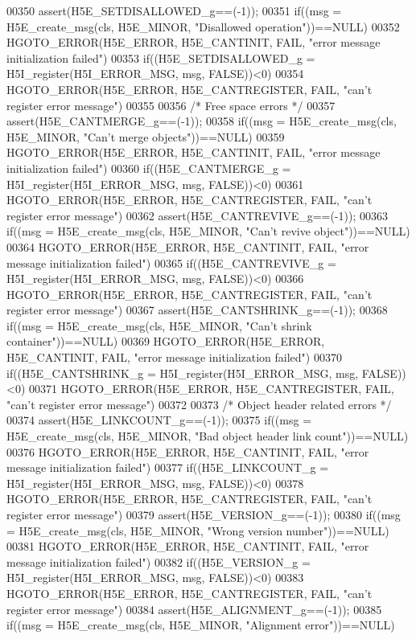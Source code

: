 \begin{DoxyCode}
00350 assert(H5E\_SETDISALLOWED\_g==(-1));
00351 if((msg = H5E\_create\_msg(cls, H5E\_MINOR, "Disallowed operation"))==NULL)
00352     HGOTO\_ERROR(H5E\_ERROR, H5E\_CANTINIT, FAIL, "error message initialization failed")
00353 if((H5E\_SETDISALLOWED\_g = H5I\_register(H5I\_ERROR\_MSG, msg, FALSE))<0)
00354     HGOTO\_ERROR(H5E\_ERROR, H5E\_CANTREGISTER, FAIL, "can't register error message")
00355 
00356 \textcolor{comment}{/* Free space errors */}
00357 assert(H5E\_CANTMERGE\_g==(-1));
00358 if((msg = H5E\_create\_msg(cls, H5E\_MINOR, "Can't merge objects"))==NULL)
00359     HGOTO\_ERROR(H5E\_ERROR, H5E\_CANTINIT, FAIL, "error message initialization failed")
00360 if((H5E\_CANTMERGE\_g = H5I\_register(H5I\_ERROR\_MSG, msg, FALSE))<0)
00361     HGOTO\_ERROR(H5E\_ERROR, H5E\_CANTREGISTER, FAIL, "can't register error message")
00362 assert(H5E\_CANTREVIVE\_g==(-1));
00363 if((msg = H5E\_create\_msg(cls, H5E\_MINOR, "Can't revive \textcolor{keywordtype}{object}"))==NULL)
00364     HGOTO\_ERROR(H5E\_ERROR, H5E\_CANTINIT, FAIL, "error message initialization failed")
00365 if((H5E\_CANTREVIVE\_g = H5I\_register(H5I\_ERROR\_MSG, msg, FALSE))<0)
00366     HGOTO\_ERROR(H5E\_ERROR, H5E\_CANTREGISTER, FAIL, "can't register error message")
00367 assert(H5E\_CANTSHRINK\_g==(-1));
00368 if((msg = H5E\_create\_msg(cls, H5E\_MINOR, "Can't shrink container"))==NULL)
00369     HGOTO\_ERROR(H5E\_ERROR, H5E\_CANTINIT, FAIL, "error message initialization failed")
00370 if((H5E\_CANTSHRINK\_g = H5I\_register(H5I\_ERROR\_MSG, msg, FALSE))<0)
00371     HGOTO\_ERROR(H5E\_ERROR, H5E\_CANTREGISTER, FAIL, "can't register error message")
00372 
00373 \textcolor{comment}{/* Object header related errors */}
00374 assert(H5E\_LINKCOUNT\_g==(-1));
00375 if((msg = H5E\_create\_msg(cls, H5E\_MINOR, "Bad \textcolor{keywordtype}{object} header link count"))==NULL)
00376     HGOTO\_ERROR(H5E\_ERROR, H5E\_CANTINIT, FAIL, "error message initialization failed")
00377 if((H5E\_LINKCOUNT\_g = H5I\_register(H5I\_ERROR\_MSG, msg, FALSE))<0)
00378     HGOTO\_ERROR(H5E\_ERROR, H5E\_CANTREGISTER, FAIL, "can't register error message")
00379 assert(H5E\_VERSION\_g==(-1));
00380 if((msg = H5E\_create\_msg(cls, H5E\_MINOR, "Wrong version number"))==NULL)
00381     HGOTO\_ERROR(H5E\_ERROR, H5E\_CANTINIT, FAIL, "error message initialization failed")
00382 if((H5E\_VERSION\_g = H5I\_register(H5I\_ERROR\_MSG, msg, FALSE))<0)
00383     HGOTO\_ERROR(H5E\_ERROR, H5E\_CANTREGISTER, FAIL, "can't register error message")
00384 assert(H5E\_ALIGNMENT\_g==(-1));
00385 if((msg = H5E\_create\_msg(cls, H5E\_MINOR, "Alignment error"))==NULL)

\end{DoxyCode}
